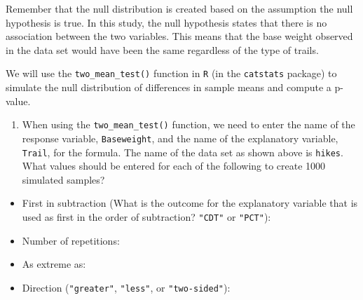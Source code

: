 \documentclass[
]{report}
\providecommand{\tightlist}{%
  \setlength{\itemsep}{0pt}\setlength{\parskip}{0pt}}
\begin{document}
Remember that the null distribution is created based on the assumption the null hypothesis is true. In this study, the null hypothesis states that there is no association between the two variables. This means that the base weight observed in the data set would have been the same regardless of the type of trails.

We will use the \texttt{two\_mean\_test()} function in \texttt{R} (in the \texttt{catstats} package) to simulate the null distribution of differences in sample means and compute a p-value.

\begin{enumerate}
\def\labelenumi{\arabic{enumi}.}
\setcounter{enumi}{8}
\tightlist
\item
  When using the \texttt{two\_mean\_test()} function, we need to enter the name of the response variable, \texttt{Baseweight}, and the name of the explanatory variable, \texttt{Trail}, for the formula. The name of the data set as shown above is \texttt{hikes}. What values should be entered for each of the following to create 1000 simulated samples?
\end{enumerate}

\vspace{1mm}

\begin{itemize}
\tightlist
\item
  First in subtraction (What is the outcome for the explanatory variable that is used as first in the order of subtraction? \texttt{"CDT"} or \texttt{"PCT"}):
\end{itemize}

\vspace{.2in}

\begin{itemize}
\tightlist
\item
  Number of repetitions:
\end{itemize}

\vspace{.2in}

\begin{itemize}
\tightlist
\item
  As extreme as:
\end{itemize}

\vspace{.2in}

\begin{itemize}
\tightlist
\item
  Direction (\texttt{"greater"}, \texttt{"less"}, or \texttt{"two-sided"}):
\end{itemize}
\end{document}
